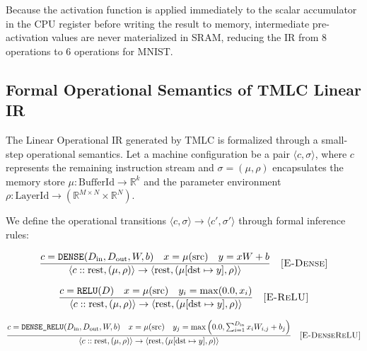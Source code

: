 \documentclass[11pt,a4paper]{article}
\begin{document}
Because the activation function is applied immediately to the scalar accumulator in the CPU register before writing the result to memory, intermediate pre-activation values are never materialized in SRAM, reducing the IR from 8 operations to 6 operations for MNIST.


\subsection{Formal Operational Semantics of TMLC Linear IR}
\label{sec:ir_semantics}
The Linear Operational IR generated by TMLC is formalized through a small-step operational semantics. Let a machine configuration be a pair $\langle c, \sigma \rangle$, where $c$ represents the remaining instruction stream and $\sigma = (\mu, \rho)$ encapsulates the memory store $\mu : \text{BufferId} \to \mathbb{R}^k$ and the parameter environment $\rho : \text{LayerId} \to (\mathbb{R}^{M \times N} \times \mathbb{R}^N)$.

We define the operational transitions $\langle c, \sigma \rangle \rightarrow \langle c', \sigma' \rangle$ through formal inference rules:

\begin{equation}
\frac{c = \texttt{DENSE}(D_{\text{in}}, D_{\text{out}}, W, b) \quad x = \mu(\text{src}) \quad y = x W + b}{\langle c :: \text{rest}, (\mu, \rho) \rangle \rightarrow \langle \text{rest}, (\mu[\text{dst} \mapsto y], \rho) \rangle} \quad \textsc{[E-Dense]}
\end{equation}

\begin{equation}
\frac{c = \texttt{RELU}(D) \quad x = \mu(\text{src}) \quad y_i = \max(0.0, x_i)}{\langle c :: \text{rest}, (\mu, \rho) \rangle \rightarrow \langle \text{rest}, (\mu[\text{dst} \mapsto y], \rho) \rangle} \quad \textsc{[E-ReLU]}
\end{equation}

\begin{equation}
\frac{c = \texttt{DENSE\_RELU}(D_{\text{in}}, D_{\text{out}}, W, b) \quad x = \mu(\text{src}) \quad y_j = \max\left(0.0, \sum_{i=1}^{D_{\text{in}}} x_i W_{i,j} + b_j\right)}{\langle c :: \text{rest}, (\mu, \rho) \rangle \rightarrow \langle \text{rest}, (\mu[\text{dst} \mapsto y], \rho) \rangle} \quad \textsc{[E-DenseReLU]}
\end{equation}
\end{document}
